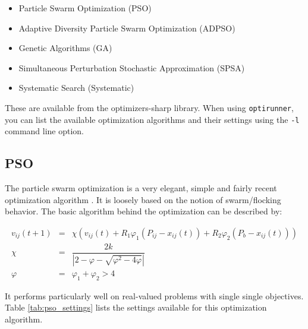 \documentclass{report}
\begin{document}
\begin{itemize}
	\item Particle Swarm Optimization (PSO)
	\item Adaptive Diversity Particle Swarm Optimization (ADPSO)
	\item Genetic Algorithms (GA)
	\item Simultaneous Perturbation Stochastic Approximation (SPSA)
	\item Systematic Search (Systematic)
\end{itemize}

These are available from the optimizers-sharp library. When using
\verb!optirunner!, you can list the available optimization algorithms and
their settings using the \verb!-l! command line option.

\subsection{PSO}
The particle swarm optimization is a very elegant, simple and fairly recent
optimization algorithm \cite{kennedy_pso_1995,clerc_pse_2002}. It is
loosely based on the notion of swarm/flocking behavior. The basic algorithm
behind the optimization can be described by:

\begin{eqnarray*}
	v_{ij}(t + 1) & = & \chi (v_{ij}(t) + R_1 \varphi_1 (P_{ij} - x_{ij}(t)) + R_2 \varphi_2 (P_b - x_{ij}(t))) \\
	\chi & = & \dfrac{2k}{|2 - \varphi - \sqrt{\varphi^2 - 4\varphi}|} \\
	\varphi & = & \varphi_1 + \varphi_2 > 4
\end{eqnarray*}

It performs particularly well on real-valued problems with single single
objectives. Table \ref{tab:pso_settings} lists the settings available for this
optimization algorithm.
\end{document}
